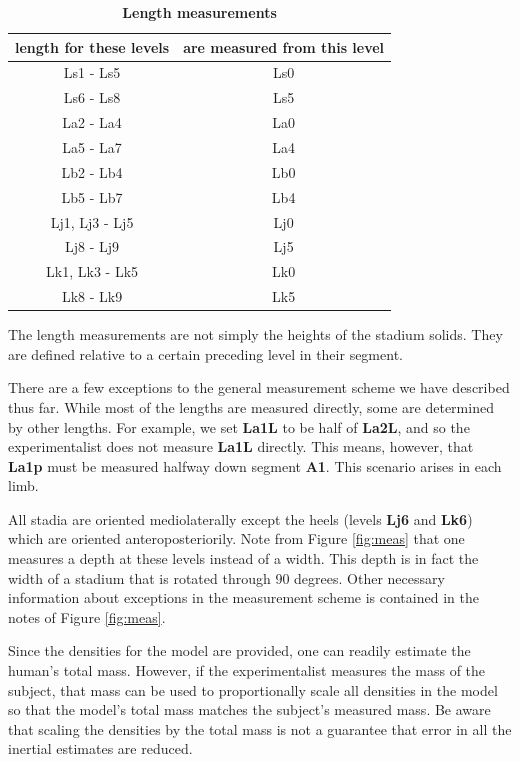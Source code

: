 \documentclass[10pt,a4paper,twocolumn]{article}
\begin{document}
\begin{table}
  \centering
  \caption{
    \bf{Length measurements}
  }
  \begin{tabular}{cc}
    \hline
    \textbf{length for these levels} & \textbf{are measured from this level}\\
    \hline
    Ls1 - Ls5 & Ls0 \\
    Ls6 - Ls8 & Ls5 \\
    La2 - La4 & La0 \\
    La5 - La7 & La4 \\
    Lb2 - Lb4 & Lb0 \\
    Lb5 - Lb7 & Lb4 \\
    Lj1, Lj3 - Lj5 & Lj0 \\
    Lj8 - Lj9 & Lj5  \\
    Lk1, Lk3 - Lk5 & Lk0 \\
    Lk8 - Lk9 & Lk5  \\
  \end{tabular}
  \begin{flushleft}
    The length measurements are not simply the heights of the stadium solids.
    They are defined relative to a certain preceding level in their segment.
  \end{flushleft}
  \label{tab:length}
\end{table}

There are a few exceptions to the general measurement scheme we have described
thus far. While most of the lengths are  measured directly, some are determined
by other lengths. For example, we set \textbf{La1L} to be half of
\textbf{La2L}, and so the experimentalist does not measure \textbf{La1L}
directly. This means, however, that \textbf{La1p} must be measured halfway down
segment \textbf{A1}. This scenario arises in each limb.

All stadia are oriented mediolaterally except the heels (levels \textbf{Lj6}
and \textbf{Lk6}) which are oriented anteroposteriorily.  Note from Figure
\ref{fig:meas} that one measures a depth at these levels instead of a width.
This depth is in fact the width of a stadium that is rotated through 90
degrees. Other necessary information about exceptions in the measurement scheme
is contained in the notes of Figure \ref{fig:meas}.

Since the densities for the model are provided, one can readily estimate the
human's total mass. However, if the experimentalist measures the mass of the
subject, that mass can be used to proportionally scale all densities in the
model so that the model's total mass matches the subject's measured mass. Be
aware that scaling the densities by the total mass is not a guarantee that
error in all the inertial estimates are reduced.
\end{document}
